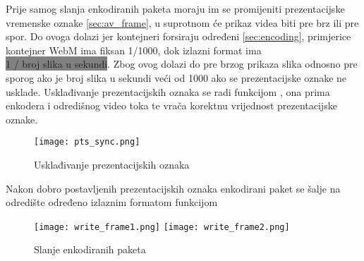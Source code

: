 \clearpage
{}
Prije samog slanja enkodiranih paketa moraju im se promijeniti prezentacijske vremenske oznake \ref{sec:av_frame}, u
suprotnom će prikaz videa biti pre brz ili pre spor.
\paraBreak
Do ovoga dolazi jer kontejneri forsiraju određeni  \ref{sec:encoding}, primjerice kontejner WebM ima
fiksan  1/1000, \cite{ffmpegBook} dok izlazni format ima \\ 
\colorbox{gray}{1 / broj slika u sekundi}.  Zbog ovog dolazi  do pre brzog prikaza slika odnosno pre sporog ako je broj
slika u sekundi veći od 1000 ako se prezentacijske oznake ne usklade.
\paraBreak
Usklađivanje prezentacijskih oznaka se radi funkcijom , ona prima  enkodera
i  odredišnog video toka te vrača korektnu vrijednost prezentacijske oznake.
\begin{figure}[H]
  \texttt{[image: pts\_sync.png]}
  \caption{Usklađivanje prezentacijskih oznaka}
\end{figure}
\noindent
Nakon dobro postavljenih prezentacijskih oznaka enkodirani paket se šalje na odredište određeno izlaznim formatom
funkcijom 
\begin{figure}[h]
  \texttt{[image: write\_frame1.png]}
  \texttt{[image: write\_frame2.png]}
  \caption{Slanje enkodiranih paketa}
\end{figure}